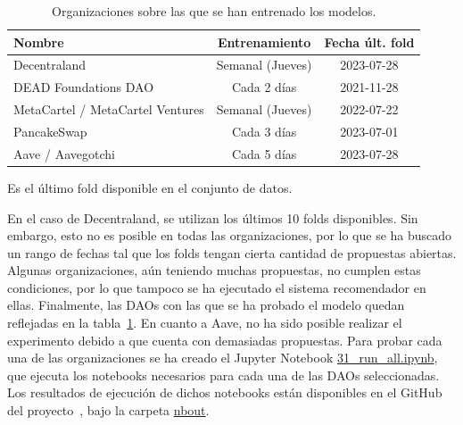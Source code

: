 \begin{table}[b]
\centering
\begin{threeparttable}[t]
    \footnotesize
    \begin{tabular}{l|cc}
        \toprule
        \textbf{Nombre} &
        \textbf{Entrenamiento} &
        \textbf{Fecha últ. fold} \\
        \midrule
        Decentraland & Semanal (Jueves) & 2023-07-28\tnote{\textdagger} \\
        DEAD Foundations DAO & Cada 2 días & 2021-11-28 \\
        MetaCartel / MetaCartel Ventures & Semanal (Jueves) & 2022-07-22 \\
        PancakeSwap & Cada 3 días & 2023-07-01 \\
        Aave / Aavegotchi & Cada 5 días & 2023-07-28\tnote{\textdagger} \\
        \bottomrule
    \end{tabular}
    \begin{tablenotes}
        \item[\textdagger] Es el último fold disponible en el conjunto de datos.
    \end{tablenotes}
    \caption{Organizaciones sobre las que se han entrenado los modelos.}
    \label{tab:7_daos_entrenadas}
\end{threeparttable}
\end{table}

En el caso de Decentraland, se utilizan los últimos 10 folds disponibles. Sin embargo, esto no es posible en todas las organizaciones, por lo que se ha buscado un rango de fechas tal que los folds tengan cierta cantidad de propuestas abiertas. Algunas organizaciones, aún teniendo muchas propuestas, no cumplen estas condiciones, por lo que tampoco se ha ejecutado el sistema recomendador en ellas. Finalmente, las DAOs con las que se ha probado el modelo quedan reflejadas en la tabla~\ref{tab:7_daos_entrenadas}. En cuanto a Aave, no ha sido posible realizar el experimento debido a que cuenta con demasiadas propuestas. Para probar cada una de las organizaciones se ha creado el Jupyter Notebook \url{31_run_all.ipynb}, que ejecuta los notebooks necesarios para cada una de las DAOs seleccionadas. Los resultados de ejecución de dichos notebooks están disponibles en el GitHub del proyecto~\cite{davo_daviddavoupm-tfm-notebooks_2024}, bajo la carpeta \url{nbout}.

